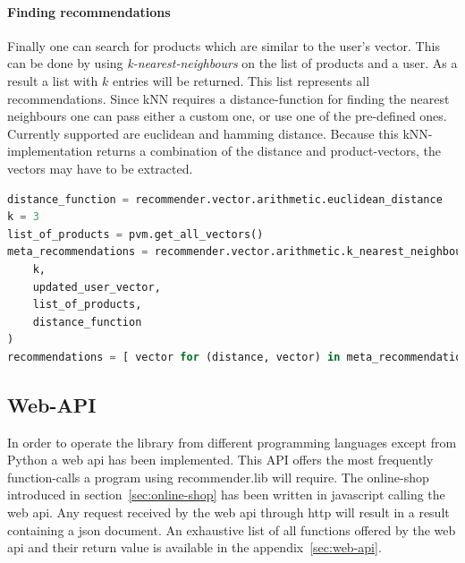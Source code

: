 \paragraph{Finding recommendations}
Finally one can search for products which are similar to the user's vector.
This can be done by using \textit{k-nearest-neighbours} on the list of products and a user.
As a result a list with $k$ entries will be returned.
This list represents all recommendations.
Since kNN requires a distance-function for finding the nearest neighbours one can pass either a custom one, or use one of the pre-defined ones.
Currently supported are euclidean and hamming distance.
Because this kNN-implementation returns a combination of the distance and product-vectors, the vectors may have to be extracted.
\begin{lstlisting}[language=Python,caption={Retrieving recommendations},label={lst:recommenderlib-knn}]
distance_function = recommender.vector.arithmetic.euclidean_distance
k = 3
list_of_products = pvm.get_all_vectors()
meta_recommendations = recommender.vector.arithmetic.k_nearest_neighbours(
    k,
    updated_user_vector,
    list_of_products,
    distance_function
)
recommendations = [ vector for (distance, vector) in meta_recommendations ]
\end{lstlisting}

\subsection{Web-API}
In order to operate the library from different programming languages except from Python a \gls{web api} has been implemented.
This API offers the most frequently function-calls a program using recommender.lib will require.
The online-shop introduced in section~\ref{sec:online-shop} has been written in \gls{javascript} calling the \gls{web api}.
Any request received by the web api through \gls{http} will result in a result containing a \gls{json} document.
An exhaustive list of all functions offered by the \gls{web api} and their return value is available in the appendix~\ref{sec:web-api}.


\FloatBarrier

